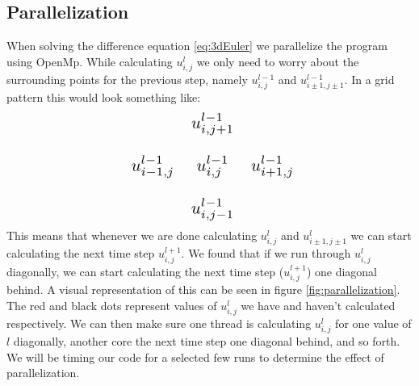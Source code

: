 \documentclass[reprint, english,notitlepage,nofootinbib]{revtex4-1}  %
\begin{document}
\subsection*{Parallelization}
When solving the difference equation \eqref{eq:3dEuler} we parallelize the program using OpenMp. While calculating $u_{i,j}^l$ we only need to worry about the surrounding points for the previous step, namely $u_{i,j}^{l-1}$ and $u_{i\pm 1,j\pm 1}^{l-1}$. In a grid pattern this would look something like:
\begin{equation*}
\scalebox{1.5}{
	$\begin{matrix}
	& u_{i,j+1}^{l-1} & \\
	\\
	u_{i-1,j}^{l-1} & u_{i,j}^{l-1} & u_{i+1,j}^{l-1} \\
	\\
	& u_{i,j-1}^{l-1} &
	\end{matrix}$}
\end{equation*}
This means that whenever we are done calculating $u_{i,j}^{l}$ and $u_{i\pm 1,j\pm 1}^{l}$ we can start calculating the next time step $u_{i,j}^{l+1}$. We found that if we run through $u_{i,j}^{l}$ diagonally, we can start calculating the next time step ($u_{i,j}^{l+1}$) one diagonal behind. A visual representation of this can be seen in figure \ref{fig:parallelization}. The red and black dots represent values of $u_{i,j}^l$ we have and haven't calculated respectively. We can then make sure one thread is calculating $u_{i,j}^l$ for one value of $l$ diagonally, another core the next time step one diagonal behind, and so forth.
We will be timing our code for a selected few runs to determine the effect of parallelization.
\end{document}
